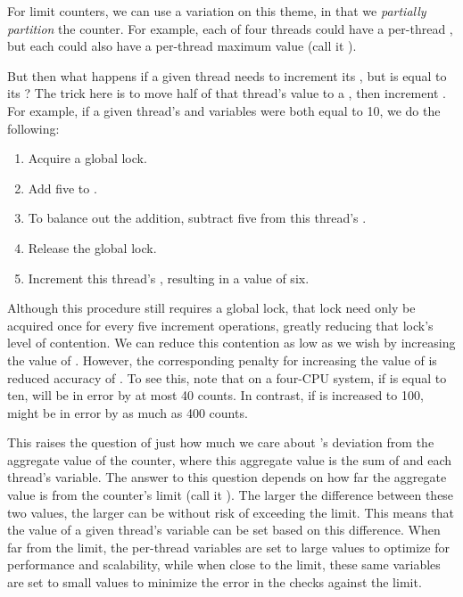 For limit counters, we can use a variation on this theme, in that
we \emph{partially partition} the counter.
For example, each of four threads could have a per-thread
, but each could also have a per-thread maximum value
(call it ).

But then what happens if a given thread needs to increment its
, but  is equal to its ?
The trick here is to move half of that thread's  value
to a , then increment .
For example, if a given thread's  and 
variables were both equal to 10, we do the following:

\begin{enumerate}
\item	Acquire a global lock.
\item	Add five to .
\item	To balance out the addition, subtract five from this
	thread's .
\item	Release the global lock.
\item	Increment this thread's , resulting in a value of six.
\end{enumerate}

Although this procedure still requires a global lock, that lock need only be
acquired once for every five increment operations, greatly reducing
that lock's level of contention.
We can reduce this contention as low as we wish by increasing the
value of .
However, the corresponding penalty for increasing the value of
 is reduced accuracy of .
To see this, note that on a four-CPU system, if 
is equal to ten,  will be in error by at most
40 counts.
In contrast, if  is increased to 100, 
might be in error by as much as 400 counts.

This raises the question of just how much we care about 's
deviation from the aggregate value of the counter, where this aggregate value
is the sum of  and each thread's  variable.
The answer to this question depends on how far the aggregate value is
from the counter's limit (call it ).
The larger the difference between these two values, the larger 
can be without risk of exceeding the  limit.
This means that the
value of a given thread's  variable can be set
based on this difference.
When far from the limit, the  per-thread variables are
set to large values to optimize for performance and scalability, while
when close to the limit, these same variables are set to small values
to minimize the error in the checks against the  limit.


